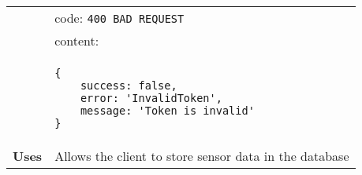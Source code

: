 \begin{adjustwidth}{1cm}{}
\begin{tabular}{|c|l|}
          &                         code: \texttt{400 BAD REQUEST} \\
          &                         content: \\
          & \begin{minipage}[t]{0.7\textwidth}
            \begin{adjustwidth}{1.5cm}{}
                \begin{verbatim}
{
    success: false, 
    error: 'InvalidToken',
    message: 'Token is invalid'
}
                \end{verbatim}
                \end{adjustwidth}
          \end{minipage} \\
              \hline
            \textbf{Uses} & Allows the client to store sensor data in the database \\
            \hline
        \end{tabular}
    \end{adjustwidth}
    

